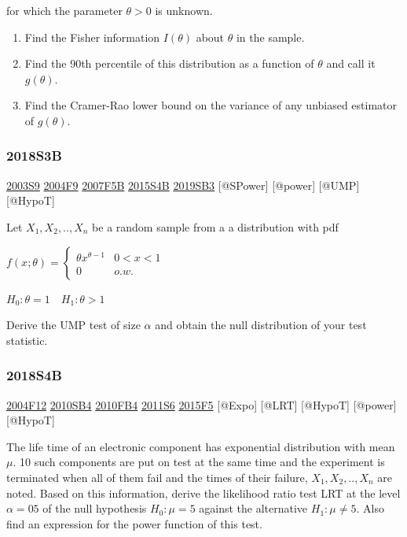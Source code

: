 \documentclass[6pt,twocolumn,Portrait]{article}
\begin{document}
for which the parameter \(\theta>0\) is unknown.

\begin{enumerate}
\def\labelenumi{(\alph{enumi})}
\item
  Find the Fisher information \(I(\theta)\) about \(\theta\) in the
  sample.
\item
  Find the 90th percentile of this distribution as a function of
  \(\theta\) and call it \(g(\theta)\).
\item
  Find the Cramer-Rao lower bound on the variance of any unbiased
  estimator of \(g(\theta)\).
\end{enumerate}

\hypertarget{s3b-2}{%
\subsubsection{2018S3B}\label{s3b-2}}

\protect\hyperlink{s9}{2003S9} \protect\hyperlink{f9-2}{2004F9}
\protect\hyperlink{f5b}{2007F5B} \protect\hyperlink{s4b-1}{2015S4B}
\protect\hyperlink{sb3-3}{2019SB3} {[}@SPower{]} {[}@power{]} {[}@UMP{]}
{[}@HypoT{]}

Let \(X_1,X_2,..,X_n\) be a random sample from a a distribution with pdf

\(f(x;\theta)=\begin{cases}\theta x^{\theta-1}& 0<x<1\\0& o.w.\end{cases}\)

\(H_0:\theta=1\quad H_1 :\theta>1\)

Derive the UMP test of size \(\alpha\) and obtain the null distribution
of your test statistic.

\hypertarget{s4b-2}{%
\subsubsection{2018S4B}\label{s4b-2}}

\protect\hyperlink{f12}{2004F12} \protect\hyperlink{sb4}{2010SB4}
\protect\hyperlink{fb4-1}{2010FB4} \protect\hyperlink{s6-2}{2011S6}
\protect\hyperlink{f5-5}{2015F5} {[}@Expo{]} {[}@LRT{]} {[}@HypoT{]}
{[}@power{]} {[}@HypoT{]}

The life time of an electronic component has exponential distribution
with mean \(\mu\). 10 such components are put on test at the same time
and the experiment is terminated when all of them fail and the times of
their failure, \(X_1,X_2,..,X_n\) are noted. Based on this information,
derive the likelihood ratio test LRT at the level \(\alpha= 05\) of the
null hypothesis \(H_0:\mu=5\) against the alternative \(H_1:\mu\neq5\).
Also find an expression for the power function of this test.
\end{document}
